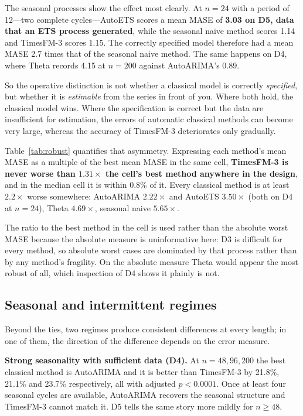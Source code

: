 \documentclass[article]{ajs}
\providecommand{\tableref}[1]{Table~\ref{#1}}
\begin{document}
The seasonal processes show the effect most clearly. At $n = 24$ with a period of 12---two complete
cycles---AutoETS scores a mean MASE of \textbf{3.03 on D5, data that an ETS process generated},
while the seasonal naive method scores 1.14 and TimesFM-3 scores 1.15. The
correctly specified model therefore had a mean MASE 2.7 times that of the seasonal naive method. The same happens on D4, where Theta
records 4.15 at $n = 200$ against AutoARIMA's 0.89.

So the operative distinction is not whether a classical model is correctly \emph{specified},
but whether it is \emph{estimable} from the series in front of you. Where both hold, the
classical model wins. Where the specification is correct but the data are insufficient for
estimation, the errors of automatic classical methods can become very large, whereas the accuracy
of TimesFM-3 deteriorates only gradually.

\tableref{tab:robust} quantifies that asymmetry. Expressing each method's mean MASE as a
multiple of the best mean MASE in the same cell, \textbf{TimesFM-3 is never worse than
$1.31\times$ the cell's best method anywhere in the design}, and in the median cell it is within
0.8\% of it. Every classical method is at least $2.2\times$ worse somewhere: AutoARIMA
$2.22\times$ and AutoETS $3.50\times$ (both on D4 at $n = 24$), Theta $4.69\times$, seasonal
naive $5.65\times$.

The ratio to the best method in the cell is used rather than the absolute worst MASE because the
absolute measure is uninformative here: D3 is difficult for every method, so absolute worst
cases are dominated by that process rather than by any method's fragility. On the absolute
measure Theta would appear the most robust of all, which inspection of D4 shows it plainly is
not.



\subsection{Seasonal and intermittent regimes}
\label{sec:regimes}

Beyond the ties, two regimes produce consistent differences at every length; in one of them,
the direction of the difference depends on the error measure.

\textbf{Strong seasonality with sufficient data (D4).} At
$n = 48, 96, 200$ the best classical method is AutoARIMA and it is better than TimesFM-3 by
21.8\%, 21.1\% and 23.7\% respectively, all with adjusted $p < 0.0001$. Once at least four
seasonal cycles are available, AutoARIMA recovers the seasonal structure and TimesFM-3 cannot
match it. D5 tells the same story more mildly for $n \geq 48$.
\end{document}
